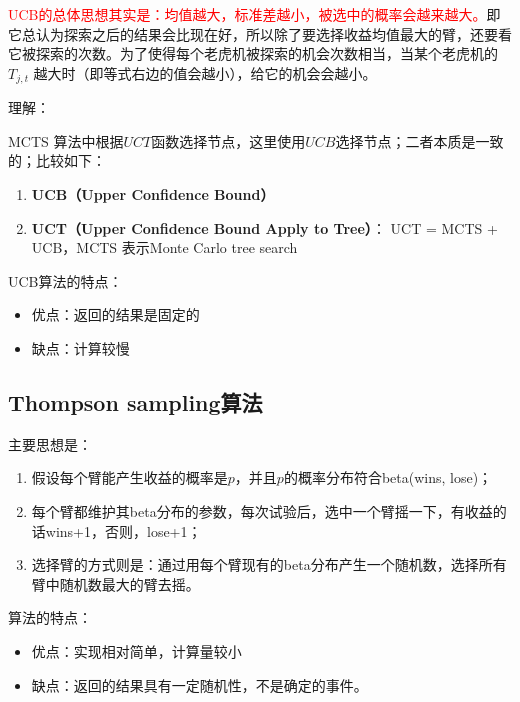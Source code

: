 \documentclass[12pt]{article}
\begin{document}
\textcolor{red}{UCB的总体思想其实是：均值越大，标准差越小，被选中的概率会越来越大。}即它总认为探索之后的结果会比现在好，所以除了要选择收益均值最大的臂，还要看它被探索的次数。为了使得每个老虎机被探索的机会次数相当，当某个老虎机的$T_{j,t}$ 越大时（即等式右边的值会越小），给它的机会会越小。

\begin{framed}
理解：

MCTS 算法中根据$UCT$函数选择节点，这里使用$UCB$选择节点；二者本质是一致的；比较如下：
\begin{enumerate}
\setlength{\itemsep}{0pt}
\setlength{\parsep}{0pt}
\setlength{\parskip}{0pt}
    \item \textbf{UCB（Upper Confidence Bound）}
    \item \textbf{UCT（Upper Confidence Bound Apply to Tree）}： UCT = MCTS + UCB，MCTS 表示Monte Carlo tree search
\end{enumerate}

\end{framed}

UCB算法的特点：
\begin{itemize}
\setlength{\itemsep}{0pt}
\setlength{\parsep}{0pt}
\setlength{\parskip}{0pt}
    \item 优点：返回的结果是固定的
    \item 缺点：计算较慢
\end{itemize}

\subsection{Thompson sampling算法}
主要思想是：
\begin{enumerate}
\setlength{\itemsep}{0pt}
\setlength{\parsep}{0pt}
\setlength{\parskip}{0pt}
    \item 假设每个臂能产生收益的概率是$p$，并且$p$的概率分布符合beta(wins, lose)；
    \item 每个臂都维护其beta分布的参数，每次试验后，选中一个臂摇一下，有收益的话wins+1，否则，lose+1；
    \item 选择臂的方式则是：通过用每个臂现有的beta分布产生一个随机数，选择所有臂中随机数最大的臂去摇。
\end{enumerate}

算法的特点：
\begin{itemize}
\setlength{\itemsep}{0pt}
\setlength{\parsep}{0pt}
\setlength{\parskip}{0pt}
    \item 优点：实现相对简单，计算量较小
    \item 缺点：返回的结果具有一定随机性，不是确定的事件。
\end{itemize}
\end{document}
